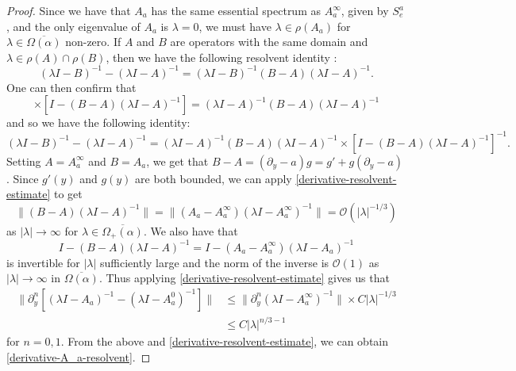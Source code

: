 \begin{proof}
	Since we have that \(A_a\) has the same essential spectrum as \(A_a^\infty\), given by \(S_e^a\), and the only eigenvalue of \(A_a\) is \(\lambda = 0\), we must have \(\lambda \in \rho(A_a)\) for \(\lambda\in\overline{\Omega(\alpha)}\) non-zero. If \(A\) and \(B\) are operators with the same domain and \(\lambda \in \rho(A)\cap\rho(B)\), then we have the following resolvent identity \cite[Thm.~4.8.2]{hille1957functional}:
	\begin{equation*} 
		(\lambda I - B)^{-1} - (\lambda I - A)^{-1}  =  (\lambda I - B)^{-1} (B-A) (\lambda I - A)^{-1}.
	\end{equation*} 
	One can then confirm that 
	\begin{equation*} 
		[(\lambda I - B)^{-1} - (\lambda I - A)^{-1} ] \times \left[ I - (B-A)(\lambda I -A)^{-1} \right]= (\lambda I - A)^{-1} (B-A) (\lambda I - A)^{-1} 
	\end{equation*} 
 	and so we have the following identity:
	\begin{equation*} 
		(\lambda I - B)^{-1} - (\lambda I - A)^{-1} = (\lambda I - A)^{-1} (B-A) (\lambda I - A)^{-1} \times \left[ I - (B-A)(\lambda I -A)^{-1} \right]^{-1}.
	\end{equation*} 
	Setting \(A = A_a^\infty\) and \(B = A_a\), we get that \(B-A = (\partial_y -a) g = g' + g(\partial_y -a)\). Since \(g'(y)\) and \(g(y)\) are both bounded, we can apply \cref{derivative-resolvent-estimate} to get 
	\begin{equation*} 
		\| (B-A)(\lambda I - A)^{-1} \| = \| (A_a - A_a^\infty)(\lambda I - A_a^\infty)^{-1} \| = \mathcal O(|\lambda|^{-1/3})
	\end{equation*} 
	as \(|\lambda|\to \infty\) for \(\lambda \in \overline{\Omega_+(\alpha)}\). We also have that 
	\begin{equation*} 
		I - (B-A)(\lambda I - A)^{-1} = I - (A_a-A_a^\infty)(\lambda I - A_a)^{-1}
	\end{equation*} 
	is invertible for \(|\lambda|\) sufficiently large and the norm of the inverse is \(\mathcal O(1)\) as \(|\lambda| \to \infty\) in \(\overline{\Omega(\alpha)}\). Thus applying \cref{derivative-resolvent-estimate} gives us that 
	\begin{equation*} 
		\begin{aligned}
			\|\partial_y^n [(\lambda I -A_a)^{-1} - (\lambda I - A_a^0)^{-1}] \| &\leq \|\partial_y^n (\lambda I - A^\infty_a)^{-1} \| \times C |\lambda|^{-1/3} \\
			&\leq C |\lambda|^{n/3 - 1}
		\end{aligned}
	\end{equation*} 
	for \(n=0,1\). From the above and \cref{derivative-resolvent-estimate}, we can obtain \cref{derivative-A_a-resolvent}.
\end{proof}

